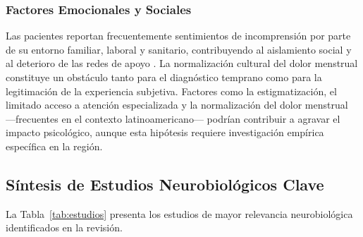 \documentclass[12pt, a4paper]{article}
\begin{document}
\subsubsection{Factores Emocionales y Sociales}

Las pacientes reportan frecuentemente sentimientos de incomprensión por parte de su entorno
familiar, laboral y sanitario, contribuyendo al aislamiento social y al deterioro de las redes
de apoyo \parencite{Aerts2018}. La normalización cultural del dolor menstrual constituye un
obstáculo tanto para el diagnóstico temprano como para la legitimación de la experiencia
subjetiva. Factores como la estigmatización, el limitado acceso a atención especializada y la
normalización del dolor menstrual —frecuentes en el contexto latinoamericano— podrían
contribuir a agravar el impacto psicológico, aunque esta hipótesis requiere investigación
empírica específica en la región.

\subsection{Síntesis de Estudios Neurobiológicos Clave}

La Tabla~\ref{tab:estudios} presenta los estudios de mayor relevancia neurobiológica
identificados en la revisión.
\end{document}
